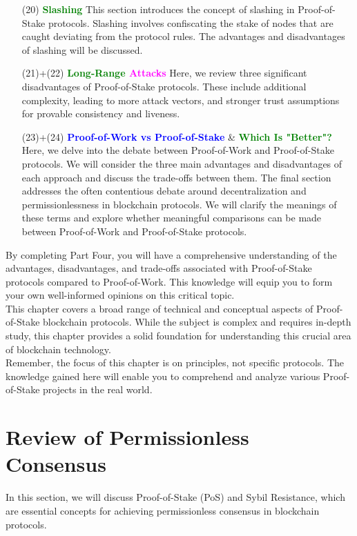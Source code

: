 \begin{enumerate}[label=(\arabic*)]
  \item[(20)] \textcolor{green}{\textbf{Slashing}} This section introduces the concept of slashing in Proof-of-Stake protocols. Slashing involves confiscating the stake of nodes that are caught deviating from the protocol rules. The advantages and disadvantages of slashing will be discussed.

  \item[(21)+(22)] \textbf{\textcolor{green}{Long-Range} \textcolor{magenta}{Attacks}} Here, we review three significant disadvantages of Proof-of-Stake protocols. These include additional complexity, leading to more attack vectors, and stronger trust assumptions for provable consistency and liveness.

  \item[(23)+(24)] \textcolor{blue}{\textbf{Proof-of-Work vs Proof-of-Stake}} \& \textcolor{green}{\textbf{Which Is "Better"?}} Here, we delve into the debate between Proof-of-Work and Proof-of-Stake protocols. We will consider the three main advantages and disadvantages of each approach and discuss the trade-offs between them. The final section addresses the often contentious debate around decentralization and permissionlessness in blockchain protocols. We will clarify the meanings of these terms and explore whether meaningful comparisons can be made between Proof-of-Work and Proof-of-Stake protocols.

\end{enumerate}
By completing Part Four, you will have a comprehensive understanding of the advantages, disadvantages, and trade-offs associated with Proof-of-Stake protocols compared to Proof-of-Work. This knowledge will equip you to form your own well-informed opinions on this critical topic.\\
This chapter covers a broad range of technical and conceptual aspects of Proof-of-Stake blockchain protocols. While the subject is complex and requires in-depth study, this chapter provides a solid foundation for understanding this crucial area of blockchain technology.\\
Remember, the focus of this chapter is on principles, not specific protocols. The knowledge gained here will enable you to comprehend and analyze various Proof-of-Stake projects in the real world.

\section{Review of Permissionless Consensus}
In this section, we will discuss Proof-of-Stake (PoS) and Sybil Resistance, which are essential concepts for achieving permissionless consensus in blockchain protocols.

